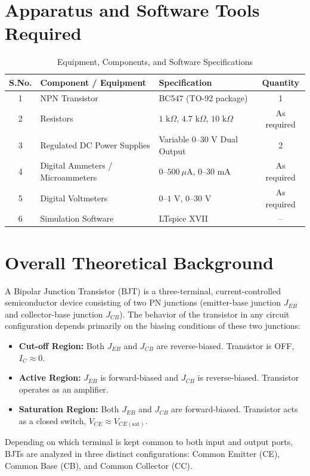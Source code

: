 \documentclass[11pt,a4paper]{article}
\begin{document}
\section{Apparatus and Software Tools Required}
\begin{table}[H]
\centering
\caption{Equipment, Components, and Software Specifications}
\begin{tabular}{cllc}
\toprule
\textbf{S.No.} & \textbf{Component / Equipment} & \textbf{Specification} & \textbf{Quantity} \\
\midrule
1 & NPN Transistor & BC547 (TO-92 package) & 1 \\
2 & Resistors & $1\text{ k}\Omega$, $4.7\text{ k}\Omega$, $10\text{ k}\Omega$ & As required \\
3 & Regulated DC Power Supplies & Variable $0\text{--}30\text{ V}$ Dual Output & 2 \\
4 & Digital Ammeters / Microammeters & $0\text{--}500\ \mu\text{A}$, $0\text{--}30\text{ mA}$ & As required \\
5 & Digital Voltmeters & $0\text{--}1\text{ V}$, $0\text{--}30\text{ V}$ & As required \\
6 & Simulation Software & LTspice XVII & -- \\
\bottomrule
\end{tabular}
\end{table}

\section{Overall Theoretical Background}
A Bipolar Junction Transistor (BJT) is a three-terminal, current-controlled semiconductor device consisting of two PN junctions (emitter-base junction $J_{EB}$ and collector-base junction $J_{CB}$). The behavior of the transistor in any circuit configuration depends primarily on the biasing conditions of these two junctions:
\begin{itemize}
    \item \textbf{Cut-off Region:} Both $J_{EB}$ and $J_{CB}$ are reverse-biased. Transistor is OFF, $I_C \approx 0$.
    \item \textbf{Active Region:} $J_{EB}$ is forward-biased and $J_{CB}$ is reverse-biased. Transistor operates as an amplifier.
    \item \textbf{Saturation Region:} Both $J_{EB}$ and $J_{CB}$ are forward-biased. Transistor acts as a closed switch, $V_{CE} \approx V_{CE(\text{sat})}$.
\end{itemize}
Depending on which terminal is kept common to both input and output ports, BJTs are analyzed in three distinct configurations: Common Emitter (CE), Common Base (CB), and Common Collector (CC).
\end{document}

